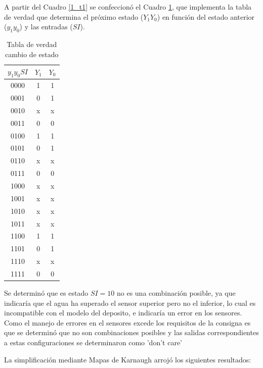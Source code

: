 A partir del Cuadro \ref{1_t1} se confeccionó el Cuadro \ref{1_t2}, que implementa la tabla de verdad que determina el próximo estado ($Y_1Y_0$) en función del estado anterior ($y_1y_0$) y las entradas ($SI$). 



\begin{table}[H]
	\centering
	\begin{tabular}{c|c|c}
	$y_1y_0SI$ & $Y_1$ & $Y_0$  \\ 
	\hline 
	0000 & 1 & 1  \\ 
	\hline 
	0001 & 0 & 1  \\ 
	\hline 
	0010 & x & x  \\ 
	\hline 
	0011 & 0 & 0  \\ 
	\hline 
	0100 & 1 & 1  \\ 
	\hline 
	0101 & 0 & 1  \\ 
	\hline 
	0110 & x & x  \\ 
	\hline 
	0111 & 0 & 0  \\ 
	\hline 
	1000 & x & x  \\ 
	\hline 
	1001 & x & x  \\ 
	\hline 
	1010 & x & x  \\ 
	\hline 
	1011 & x & x  \\ 
	\hline 
	1100 & 1 & 1  \\ 
	\hline 
	1101 & 0 & 1  \\ 
	\hline 
	1110 & x & x  \\ 
	\hline 
	1111 & 0 & 0  \\ 
	\end{tabular} 
	\caption{Tabla de verdad cambio de estado}
	\label{1_t2}
\end{table}

Se determinó que es estado $SI=10$ no es una combinación posible, ya que indicaría que el agua ha superado el sensor superior pero no el inferior, lo cual es incompatible con el modelo del deposito, e indicaría un error en los sensores. Como el manejo de errores en el sensores excede los requisitos de la consigna es que se determinó que no son combinaciones posibles y las salidas correspondientes a estas configuraciones se determinaron como 'don't care'

La simplificación mediante Mapas de Karnaugh arrojó los siguientes resultados:

